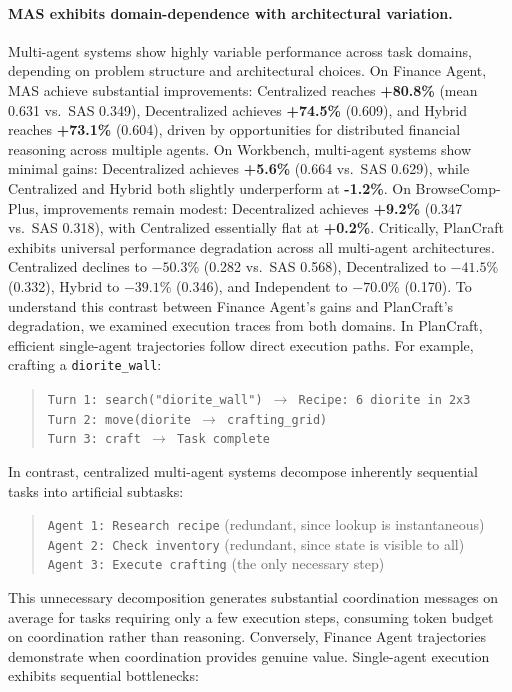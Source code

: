 \paragraph{MAS exhibits domain-dependence with architectural variation.}
Multi-agent systems show highly variable performance across task domains, depending on problem structure and architectural choices. On Finance Agent, MAS achieve substantial improvements: Centralized reaches \textbf{+80.8\%} (mean 0.631 vs.\ SAS 0.349), Decentralized achieves \textbf{+74.5\%} (0.609), and Hybrid reaches \textbf{+73.1\%} (0.604), driven by opportunities for distributed financial reasoning across multiple agents. On Workbench, multi-agent systems show minimal gains: Decentralized achieves \textbf{+5.6\%} (0.664 vs.\ SAS 0.629), while Centralized and Hybrid both slightly underperform at \textbf{-1.2\%}. On BrowseComp-Plus, improvements remain modest: Decentralized achieves \textbf{+9.2\%} (0.347 vs.\ SAS 0.318), with Centralized essentially flat at \textbf{+0.2\%}. Critically, PlanCraft exhibits universal performance degradation 
across all multi-agent architectures. Centralized declines to 
$-50.3$\% (0.282 vs.\ SAS 0.568), Decentralized to $-41.5$\% (0.332), Hybrid to $-39.1$\% (0.346), and Independent to $-70.0$\% (0.170). To understand this
contrast between Finance Agent's gains and PlanCraft's degradation, we examined execution traces from both domains. In PlanCraft, efficient single-agent trajectories follow direct execution paths. For example, crafting a \texttt{diorite\_wall}:
\begin{quote}
\texttt{Turn 1: search("diorite\_wall") $\rightarrow$ Recipe: 6 diorite in 2x3}\\
\texttt{Turn 2: move(diorite $\rightarrow$ crafting\_grid)}\\
\texttt{Turn 3: craft $\rightarrow$ Task complete}
\end{quote}
In contrast, centralized multi-agent systems decompose inherently sequential tasks into artificial subtasks:
\begin{quote}
\texttt{Agent 1: Research recipe} (redundant, since lookup is instantaneous)\\
\texttt{Agent 2: Check inventory} (redundant, since state is visible to all)\\
\texttt{Agent 3: Execute crafting} (the only necessary step)
\end{quote}
This unnecessary decomposition generates substantial coordination messages on average for tasks requiring only a few execution steps, consuming token budget on coordination rather than reasoning. Conversely, Finance Agent trajectories demonstrate when coordination provides genuine value. Single-agent execution exhibits sequential bottlenecks:
